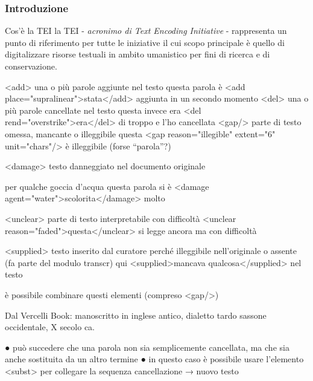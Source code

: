 \begin{frame}
    \frametitle{Introduzione}
    \addtocounter{nframe}{1}
    

    \begin{block}{Cos'è la TEI}
        la TEI - \textit{acronimo di Text Encoding Initiative} - rappresenta un punto di riferimento per tutte le iniziative il cui scopo principale è quello di digitalizzare risorse testuali in ambito umanistico per fini di ricerca e di conservazione.
    \end{block}
    
\end{frame}

<add> una o più parole aggiunte nel testo
questa parola è <add place="supralinear">stata</add> aggiunta in un secondo momento
<del> una o più parole cancellate nel testo
questa invece era <del rend="overstrike">era</del>
 di troppo e l’ho cancellata
<gap/> parte di testo omessa, mancante o illeggibile
questa <gap reason="illegible" extent="6" unit="chars"/> è illeggibile (forse “parola”?)

<damage> testo danneggiato nel documento originale
   
per qualche goccia d’acqua questa parola si è
   <damage agent="water">scolorita</damage> molto

   <unclear> parte di testo interpretabile con difficoltà
<unclear reason="faded">questa</unclear> si legge
   ancora ma con difficoltà

   <supplied> testo inserito dal curatore perché illeggibile nell’originale o assente (fa parte del modulo transcr)
qui <supplied>mancava qualcosa</supplied> nel testo

è possibile combinare questi elementi (compreso <gap/>)

Dal Vercelli Book: manoscritto in inglese antico, dialetto tardo sassone occidentale, X secolo ca.

● può succedere che una parola non sia semplicemente cancellata, ma che sia anche sostituita da un altro termine
● in questo caso è possibile usare l’elemento <subst> per collegare la sequenza cancellazione → nuovo testo

